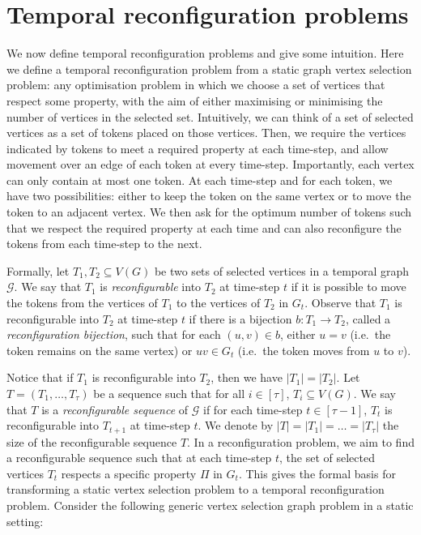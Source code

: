 \section{Temporal reconfiguration problems}
\label{sec:tmp reconfiguration problems}
We now define temporal reconfiguration problems and give some intuition.  Here we define a temporal reconfiguration problem from a static graph vertex selection problem: any optimisation problem in which we choose a set of vertices that respect some property, with the aim of either maximising or minimising the number of vertices in the selected set.  
%
Intuitively, we can think of a set of selected vertices as a set of tokens placed on those vertices.  
Then, we require the vertices indicated by tokens to meet a required property at each time-step, and allow movement over an edge of each token at every time-step.
Importantly, each vertex can only contain at most one token. At each time-step and for each token, we have two possibilities: either to keep the token on the same vertex or to move the token to an adjacent vertex.  We then ask for the optimum number of tokens such that we respect the required property at each time and can also reconfigure the tokens from each time-step to the next.  

%
Formally, 
let $T_1,T_2 \subseteq V(G)$ be two sets of selected vertices in a temporal graph $\mathcal{G}$. We say that $T_1$ is \emph{reconfigurable} into $T_2$ at time-step $t$ if it is possible to move the tokens from the vertices of $T_1$ to the vertices of $T_2$ in $G_t$. Observe that $T_1$ is reconfigurable into $T_2$ at time-step $t$ if there is a bijection $b : T_1 \to T_2$, called a \emph{reconfiguration bijection}, such that for each $(u,v) \in b$, either $u=v$ (i.e.\ the token remains on the same vertex) or $uv \in G_t$ (i.e.\ the token moves from $u$ to $v$).

%
Notice that if $T_1$ is reconfigurable into $T_2$, then we have $|T_1|=|T_2|$. Let $T=(T_1,\dots,T_\tau)$ be a sequence such that for all $i \in [\tau]$, $T_i \subseteq V(G)$.  We say that $T$ is a \emph{reconfigurable sequence} of $\mathcal{G}$ if for each time-step $t \in [\tau-1]$, $T_t$ is reconfigurable into $T_{t+1}$ at time-step $t$. We denote by $|T|=|T_1|=\dots=|T_\tau|$ the size of the reconfigurable sequence $T$.
%
In a reconfiguration problem, we aim to find a reconfigurable sequence such that at each time-step $t$, the set of selected vertices $T_t$ respects a specific property $\Pi$ in $G_t$. This gives the formal basis for transforming a static vertex selection problem to a temporal reconfiguration problem. Consider the following generic vertex selection graph problem in a static setting:

